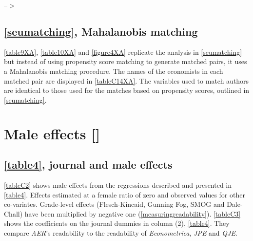 \begin{appendices}




--$>$

\subsection{\autoref{seumatching}, Mahalanobis matching}
\label{appendixmahalanobis}

\autoref{table9XA}, \autoref{table10XA} and \autoref{figure4XA} replicate the analysis in \autoref{seumatching} but instead of using propensity score matching to generate matched pairs, it uses a Mahalanobis matching procedure. The names of the economists in each matched pair are displayed in \autoref{tableC14XA}. The variables used to match authors are identical to those used for the matches based on propensity scores, outlined in \autoref{seumatching}.









\clearpage

\section{Male effects []}
\label{maleeffects}

\subsection{\autoref{table4}, journal and male effects}
\label{appendixarticlemale}

\autoref{tableC2} shows male effects from the regressions described and presented in \autoref{table4}. Effects estimated at a female ratio of zero and observed values for other co-variates. Grade-level effects (Flesch-Kincaid, Gunning Fog, SMOG and Dale-Chall) have been multiplied by negative one (\autoref{measuringreadability}). \autoref{tableC3} shows the coefficients on the journal dummies in column (2), \autoref{table4}. They compare \emph{AER}'s readability to the readability of \emph{Econometrica}, \emph{JPE} and \emph{QJE}.


\end{appendices}
